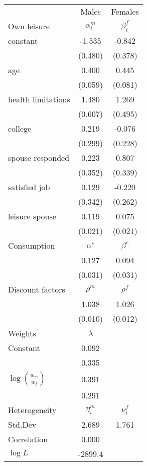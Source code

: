 \begin{tabular}{lcc} 
\hline\hline 
 & Males & Females \\ 
Own leisure & $\alpha_{i}^{m}$ & $\beta_{i}^{f}$ \\ 
constant & -1.535 & -0.842 \\ 
 & (0.480) & (0.378) \\ 
age & 0.400 & 0.445 \\ 
 & (0.059) & (0.081) \\ 
health limitations & 1.480 & 1.269 \\ 
 & (0.607) & (0.495) \\ 
college & 0.219 & -0.076 \\ 
 & (0.299) & (0.228) \\ 
spouse responded & 0.223 & 0.807 \\ 
 & (0.352) & (0.339) \\ 
satisfied job & 0.129 & -0.220 \\ 
 & (0.342) & (0.262) \\ 
leisure spouse & 0.119 & 0.075 \\ 
 & (0.021) & (0.021) \\ 
Consumption & $\alpha^{c}$ & $\beta^{c}$ \\ 
 & 0.127 & 0.094 \\ 
 & (0.031) & (0.031) \\ 
Discount factors & $\rho^m$ & $\rho^f$ \\ 
 & 1.038 & 1.026 \\ 
 & (0.010) & (0.012) \\ 
Weights & $\lambda$ &  \\ 
Constant & 0.092 &  \\ 
 & 0.335 &  \\ 
$\log(\frac{w_m}{w_f})$ & 0.391 &  \\ 
 & 0.291 &  \\ 
Heterogeneity & $\eta_i^m$ & $\nu_i^f$ \\ 
Std.Dev & 2.689 & 1.761 \\ 
Correlation & 0.000 &  \\ 
\hline 
$\log L$ & -2899.4 & \\ 
\hline \hline 
\end{tabular} 

